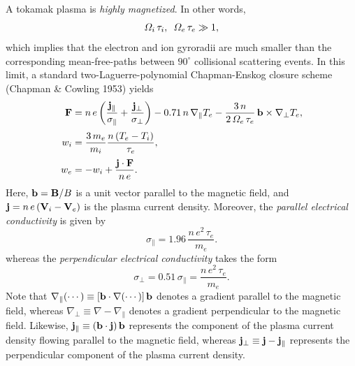 \documentclass[notitlepage,12pt]{article}
\begin{document}
A tokamak plasma is {\em highly magnetized}. In other words, 
\begin{equation}
{\mit\Omega}_i\,\tau_i, \,\,\,{\mit\Omega}_e\, \tau_e \gg 1,
\end{equation}
 which implies that the electron and ion gyroradii are much  smaller than the
corresponding mean-free-paths between $90^\circ$ collisional scattering events. In this limit, a standard two-Laguerre-polynomial
Chapman-Enskog closure scheme (Chapman \& Cowling 1953) yields
\begin{align}\label{e3.91a}
{\bf F}&= n\,e\left(\frac{{\bf j}_\parallel}{\sigma_\parallel}
+\frac{{\bf j}_\perp}{\sigma_\perp}\right) -0.71\,n\,\nabla_\parallel T_e
-\frac{3\,n}{2\,{\mit\Omega}_e\,\tau_e}\,{\bf b}\times\nabla_\perp T_e,
\\[0.5ex]
w_i &= \frac{3\,m_e}{m_i} \frac{n\,(T_e-T_i)}{\tau_e},\\[0.5ex]
w_e &= -w_i + \frac{ {\bf j}\cdot {\bf F} }{n \,e}.
\end{align}
Here, ${\bf b}={\bf B}/B$ is a unit vector parallel to the magnetic field, and ${\bf j}= n\,e\,({\bf V}_i-{\bf V}_e)$ is the plasma current density. 
Moreover, the {\em parallel electrical conductivity}\/ is given by
\begin{equation}\label{e3.83}
\sigma_\parallel = 1.96\,\frac{n \,e^2\,\tau_e}{m_e}.
\end{equation} 
whereas the {\em perpendicular electrical conductivity}\/ takes the form
\begin{equation}\label{e3.92}
\sigma_\perp = 0.51\,\sigma_\parallel = \frac{n\,e^2\,\tau_e}{m_e}.
\end{equation}
Note that $\nabla_\parallel(\cdots) \equiv [{\bf b}\cdot\nabla
(\cdots)]\,{\bf b}$ denotes a
gradient parallel to the magnetic field, whereas $\nabla_\perp \equiv
 \nabla-\nabla_\parallel$ denotes a gradient perpendicular to the magnetic
field. Likewise, ${\bf j}_\parallel \equiv ({\bf b}\cdot{\bf j})\,{\bf b}$
represents the component of the plasma current density  flowing parallel to the
magnetic field, whereas ${\bf j}_\perp \equiv {\bf j} - {\bf j}_\parallel$
represents the perpendicular component of the plasma current density.
\end{document}
